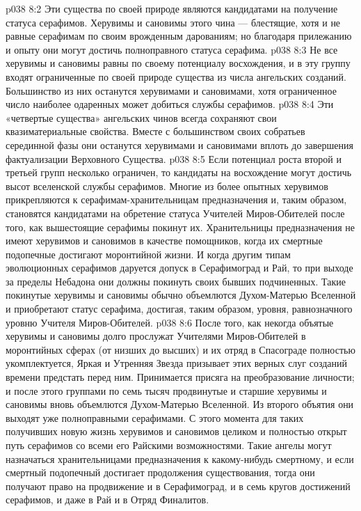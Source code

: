 \vs p038 8:2 \bibnobreakspace {} Эти существа по своей природе являются кандидатами на получение статуса серафимов. Херувимы и сановимы этого чина --- блестящие, хотя и не равные серафимам по своим врожденным дарованиям; но благодаря прилежанию и опыту они могут достичь полноправного статуса серафима.
\vs p038 8:3 \bibnobreakspace {} Не все херувимы и сановимы равны по своему потенциалу восхождения, и в эту группу входят ограниченные по своей природе существа из числа ангельских созданий. Большинство из них останутся херувимами и сановимами, хотя ограниченное число наиболее одаренных может добиться службы серафимов.
\vs p038 8:4 \bibnobreakspace {} Эти «четвертые существа» ангельских чинов всегда сохраняют свои квазиматериальные свойства. Вместе с большинством своих собратьев серединной фазы они останутся херувимами и сановимами вплоть до завершения фактуализации Верховного Существа.
\vs p038 8:5 \pc Если потенциал роста второй и третьей групп несколько ограничен, то кандидаты на восхождение могут достичь высот вселенской службы серафимов. Многие из более опытных херувимов прикрепляются к серафимам\hyp{}хранительницам предназначения и, таким образом, становятся кандидатами на обретение статуса Учителей Миров\hyp{}Обителей после того, как вышестоящие серафимы покинут их. Хранительницы предназначения не имеют херувимов и сановимов в качестве помощников, когда их смертные подопечные достигают моронтийной жизни. И когда другим типам эволюционных серафимов даруется допуск в Серафимоград и Рай, то при выходе за пределы Небадона они должны покинуть своих бывших подчиненных. Такие покинутые херувимы и сановимы обычно объемлются Духом\hyp{}Матерью Вселенной и приобретают статус серафима, достигая, таким образом, уровня, равнозначного уровню Учителя Миров\hyp{}Обителей.
\vs p038 8:6 После того, как некогда объятые херувимы и сановимы долго прослужат Учителями Миров\hyp{}Обителей в моронтийных сферах (от низших до высших) и их отряд в Спасограде полностью укомплектуется, Яркая и Утренняя Звезда призывает этих верных слуг созданий времени предстать перед ним. Принимается присяга на преобразование личности; и после этого группами по семь тысяч продвинутые и старшие херувимы и сановимы вновь объемлются Духом\hyp{}Матерью Вселенной. Из второго объятия они выходят уже полноправными серафимами. С этого момента для таких получивших новую жизнь херувимов и сановимов целиком и полностью открыт путь серафимов со всеми его Райскими возможностями. Такие ангелы могут назначаться хранительницами предназначения к какому\hyp{}нибудь смертному, и если смертный подопечный достигает продолжения существования, тогда они получают право на продвижение и в Серафимоград, и в семь кругов достижений серафимов, и даже в Рай и в Отряд Финалитов.
